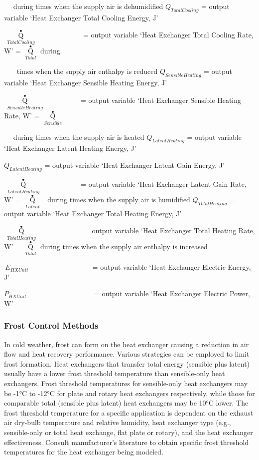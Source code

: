 ~~ during times when the supply air is dehumidified \(Q_{TotalCooling}\) = output variable `Heat Exchanger Total Cooling Energy, J'

\(\,{\mathop Q\limits^ \bullet_{TotalCooling}}\) ~~~~~~~~~~~~ = output variable `Heat Exchanger Total Cooling Rate, W' = \({\mathop Q\limits^ \bullet_{Total}}\) during

~~~ times when the supply air enthalpy is reduced \(Q_{SensibleHeating}\) = output variable `Heat Exchanger Sensible Heating Energy, J'

\(\,{\mathop Q\limits^ \bullet_{SensibleHeating}}\) ~~~~~~~~~ = output variable `Heat Exchanger Sensible Heating Rate, W' = \({\mathop Q\limits^ \bullet_{Sensible}}\)

~~ during times when the supply air is heated \(Q_{LatentHeating}\) = output variable `Heat Exchanger Latent Heating Energy, J'

\(Q_{LatentHeating}\) = output variable `Heat Exchanger Latent Gain Energy, J'

\(\,{\mathop Q\limits^ \bullet_{LatentHeating}}\) ~~~~~~~~~~ = output variable `Heat Exchanger Latent Gain Rate, W' = \({\mathop Q\limits^ \bullet_{Latent}}\) ~during times when the supply air is humidified \(Q_{TotalHeating}\) = output variable `Heat Exchanger Total Heating Energy, J'

\(\,{\mathop Q\limits^ \bullet_{TotalHeating}}\) ~~~~~~~~~~~~ = output variable `Heat Exchanger Total Heating Rate, W' = \({\mathop Q\limits^ \bullet_{Total}}\) during times when the supply air enthalpy is increased

\(\,{E_{HXUnit}}\) ~~~~~~~~~~~~~~~~~ = output variable `Heat Exchanger Electric Energy, J'

\({P_{HXUnit}}\) ~~~~~~~~~~~~~~~~~~ = output variable `Heat Exchanger Electric Power, W'

\subsubsection{Frost Control Methods}\label{frost-control-methods}

In cold weather, frost can form on the heat exchanger causing a reduction in air flow and heat recovery performance. Various strategies can be employed to limit frost formation. Heat exchangers that transfer total energy (sensible plus latent) usually have a lower frost threshold temperature than sensible-only heat exchangers. Frost threshold temperatures for sensible-only heat exchangers may be -1°C to -12°C for plate and rotary heat exchangers respectively, while those for comparable total (sensible plus latent) heat exchangers may be 10°C lower. The frost threshold temperature for a specific application is dependent on the exhaust air dry-bulb temperature and relative humidity, heat exchanger type (e.g., sensible-only or total heat exchange, flat plate or rotary), and the heat exchanger effectiveness. Consult manufacturer's literature to obtain specific frost threshold temperatures for the heat exchanger being modeled.

